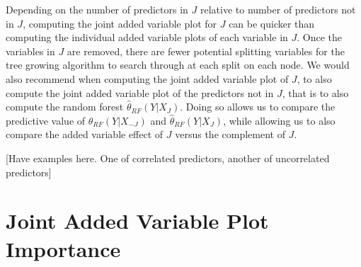 \documentclass[12pt,twoside]{reedthesis}
\theoremstyle{definition}
\theoremstyle{definition}
\theoremstyle{definition}
\theoremstyle{remark}
\begin{document}
Depending on the number of predictors in \(J\) relative to number of
predictors not in \(J\), computing the joint added variable plot for
\(J\) can be quicker than computing the individual added variable plots
of each variable in \(J\). Once the variables in \(J\) are removed,
there are fewer potential splitting variables for the tree growing
algorithm to search through at each split on each node. We would also
recommend when computing the joint added variable plot of \(J\), to also
compute the joint added variable plot of the predictors not in \(J\),
that is to also compute the random forest \(\hat{\theta}_{RF}(Y|X_J)\).
Doing so allows us to compare the predictive value of
\(\hat{\theta}_{RF}(Y|X_{-J})\) and \(\hat{\theta}_{RF}(Y|X_J)\), while
allowing us to also compare the added variable effect of \(J\) versus
the complement of \(J\). \par

{[}Have examples here. One of correlated predictors, another of
uncorrelated predictors{]} \par

\section{Joint Added Variable Plot
Importance}\label{joint-added-variable-plot-importance-1}
\end{document}
